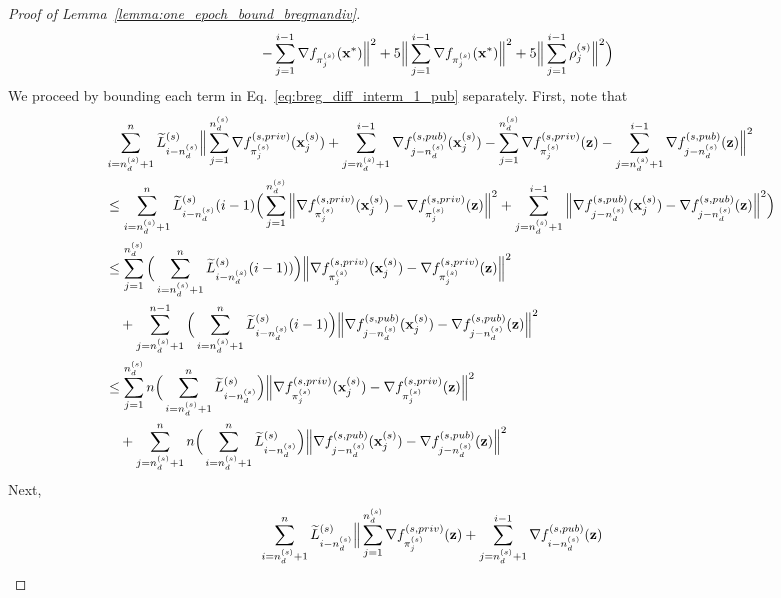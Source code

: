 \begin{proof}[Proof of Lemma~\ref{lemma:one_epoch_bound_bregmandiv}]
\begin{align}
            - \sum_{j=1}^{i-1} \nabla f_{\pi_j^{(s)}}({\mathbf{x}}^*) \Big\|^2
            + 5\Big\|\sum_{j=1}^{i-1} \nabla f_{\pi_j^{(s)}}({\mathbf{x}}^*) \Big\|^2
            + 5\Big\|\sum_{j=1}^{i-1}\rho_j^{(s)} \Big\|^2
        \Big)
    \end{align}
    We proceed by bounding each term in Eq.~\ref{eq:breg_diff_interm_1_pub} separately. First, note that
    \begin{align}
        &\sum_{i=n_d^{(s)}+1}^{n} \widetilde{L}_{i-n_d^{(s)}}^{(s)}
        \Big\| \sum_{j=1}^{n_d^{(s)}} \nabla f_{\pi_j^{(s)}}^{(s, priv)}({\mathbf{x}}_j^{(s)}) + \sum_{j=n_d^{(s)}+1}^{i-1} \nabla f_{j-n_d^{(s)}}^{(s, pub)}({\mathbf{x}}_j^{(s)}) 
        - \sum_{j=1}^{n_d^{(s)}} \nabla f_{\pi_j^{(s)}}^{(s, priv)}({\mathbf{z}}) - \sum_{j=n_d^{(s)}+1}^{i-1} \nabla f_{j-n_d^{(s)}}^{(s, pub)}({\mathbf{z}}) \Big\|^2\\
        &\leq \sum_{i=n_d^{(s)}+1}^{n}
        \widetilde{L}_{i-n_d^{(s)}}^{(s)}
        (i-1) \Big(\sum_{j=1}^{n_d^{(s)}} \Big\| \nabla f_{\pi_j^{(s)}}^{(s, priv)}({\mathbf{x}}_j^{(s)}) - \nabla f_{\pi_j^{(s)}}^{(s, priv)}({\mathbf{z}})\Big\|^2
        + \sum_{j=n_d^{(s)}+1}^{i-1}\Big\| \nabla f_{j-n_d^{(s)}}^{(s, pub)}({\mathbf{x}}_j^{(s)}) - \nabla f_{j-n_d^{(s)}}^{(s, pub)}({\mathbf{z}})\Big\|^2
        \Big)\\\
    \label{eq:breg_diff_term_1_pub}
        &\leq \sum_{j=1}^{n_d^{(s)}} \Big(\sum_{i=n_d^{(s)}+1}^{n} \widetilde{L}_{i-n_d^{(s)}}^{(s)}(i-1))\Big)\Big\| \nabla f_{\pi_j^{(s)}}^{(s, priv)}({\mathbf{x}}_j^{(s)}) - \nabla f_{\pi_j^{(s)}}^{(s, priv)}({\mathbf{z}}) \Big\|^2\\
        \nonumber
        &\quad + \sum_{j=n_d^{(s)}+1}^{n-1} \Big(\sum_{i=n_d^{(s)}+1}^{n} \widetilde{L}_{i-n_d^{(s)}}^{(s)}(i-1)\Big)\Big\| \nabla f_{j-n_d^{(s)}}^{(s, pub)}({\mathbf{x}}_j^{(s)})
        - \nabla f_{j-n_d^{(s)}}^{(s, pub)}({\mathbf{z}})\Big\|^2\\
        &\leq \sum_{j=1}^{n_d^{(s)}} n \Big(\sum_{i=n_d^{(s)}+1}^{n}\widetilde{L}_{i-n_d^{(s)}}^{(s)}\Big) \Big\| \nabla f_{\pi_j^{(s)}}^{(s, priv)}({\mathbf{x}}_j^{(s)}) - \nabla f_{\pi_j^{(s)}}^{(s, priv)}({\mathbf{z}})\Big\|^2 \\
        \nonumber
        &\quad 
        + \sum_{j=n_d^{(s)}+1}^{n} n \Big(\sum_{i=n_d^{(s)}+1}^{n} \widetilde{L}_{i-n_d^{(s)}}^{(s)}\Big)
        \Big\| \nabla f_{j-n_d^{(s)}}^{(s, pub)}({\mathbf{x}}_j^{(s)}) - \nabla f_{j-n_d^{(s)}}^{(s,pub)}({\mathbf{z}})\Big\|^2 
    \end{align}
    Next, 
    \begin{align}
    \label{eq:breg_diff_term_dissim_pub}
        &\sum_{i=n_d^{(s)}+1}^{n} \widetilde{L}_{i-n_d^{(s)}}^{(s)} \Big\| \sum_{j=1}^{n_d^{(s)}} \nabla f_{\pi_j^{(s)}}^{(s, priv)}(\rvz) + \sum_{j=n_d^{(s)}+1}^{i-1} \nabla f_{i-n_d^{(s)}}^{(s, pub)}(\rvz)

\end{align}
\end{proof}
